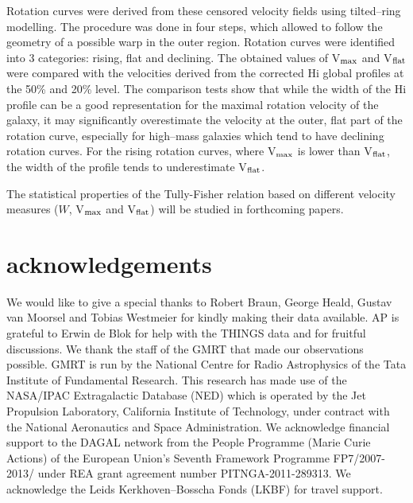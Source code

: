 \documentclass[usenatbib,useAMS]{mnras}
\begin{document}
Rotation curves were derived from these censored velocity fields using
tilted--ring modelling.  The procedure was done in four steps, which
allowed to follow the geometry of a possible warp in the outer region. 
Rotation curves were identified into 3 categories: rising, flat and
declining.  The obtained values of V$_{\rm max}$ and V$_{\rm flat}$ were
compared with the velocities derived from the corrected H{\sc i} global
profiles at the 50\% and 20\% level.  The comparison tests show that
while the width of the H{\sc i} profile can be a good representation for
the maximal rotation velocity of the galaxy, it may significantly
overestimate the velocity at the outer, flat part of the rotation curve,
especially for high--mass galaxies which tend to have declining rotation
curves.  For the rising rotation curves, where V$_{\rm max}$ is lower
than V$_{\rm flat}$, the width of the profile tends to underestimate
V$_{\rm flat}$. 

The statistical properties of the Tully-Fisher relation based on
different velocity measures ($W$, V$_{\rm max}$ and V$_{\rm flat}$) will
be studied in forthcoming papers.

\section*{acknowledgements}

We would like to give a special thanks to Robert Braun, George Heald,
Gustav van Moorsel and Tobias Westmeier for kindly making their data
available.  AP is grateful to Erwin de Blok for help with the THINGS
data and for fruitful discussions.  We thank the staff of the GMRT that
made our observations possible.  GMRT is run by the National Centre for
Radio Astrophysics of the Tata Institute of Fundamental Research.  This
research has made use of the NASA/IPAC Extragalactic Database (NED)
which is operated by the Jet Propulsion Laboratory, California Institute
of Technology, under contract with the National Aeronautics and Space
Administration.  We acknowledge financial support to the DAGAL network
from the People Programme (Marie Curie Actions) of the European Union's
Seventh Framework Programme FP7/2007-2013/ under REA grant agreement
number PITNGA-2011-289313.  We acknowledge the Leids Kerkhoven--Bosscha
Fonds (LKBF) for travel support. 
\end{document}
